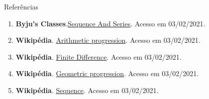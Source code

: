 \begin{frame}[fragile]{Referências}

    \begin{enumerate}
        \item \textbf{Byju's Classes}.\href{https://byjus.com/maths/sequence-and-series/}{Sequence And Series}. Acesso em 03/02/2021.

        \item \textbf{Wikipédia}. \href{https://en.wikipedia.org/wiki/Arithmetic_progression}{Arithmetic progression}. Acesso em 03/02/2021.

        \item \textbf{Wikipédia}. \href{https://en.wikipedia.org/wiki/Finite_difference}{Finite Difference}. Acesso em 03/02/2021.

        \item \textbf{Wikipédia}. \href{https://en.wikipedia.org/wiki/Geometric_progression}{Geometric progression}. Acesso em 03/02/2021.

        \item \textbf{Wikipédia}. \href{https://en.wikipedia.org/wiki/Sequence}{Sequence}. Acesso em 03/02/2021.
    \end{enumerate}

\end{frame}
